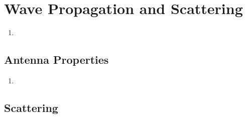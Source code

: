 \documentclass[10pt]{article}
\begin{document}
\section*{Wave Propagation and Scattering}

\begin{enumerate}

	\item


\end{enumerate}


\subsection*{Antenna Properties}

\begin{enumerate}

	\item


\end{enumerate}


\subsection*{Scattering}
\end{document}
